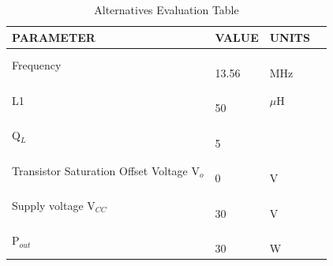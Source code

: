 \documentclass[12pt]{article}
\begin{document}
\begin{table}[h!]
\centering
\caption{Alternatives Evaluation Table}
\begin{tabular}{| l | l | l | l |}
\hline
\parbox{0.24\linewidth}{\centering PARAMETER} & \parbox{0.240\linewidth}{\centering 
VALUE
} & \parbox{0.240\linewidth}{\centering 
UNITS
}\\ \hline
\parbox{0.24\linewidth}{\raggedleft Frequency} &
\parbox{0.240\linewidth}{\hfill \\
13.56
\\} & \parbox{0.240\linewidth}{\hfill \\
MHz
\\}\\ \hline
\parbox{0.24\linewidth}{\raggedleft L1} & 
\parbox{0.240\linewidth}{\hfill \\
50
\\} & \parbox{0.240\linewidth}{\hfill \\
$\mu$H
\\}\\ \hline
\parbox{0.24\linewidth}{\raggedleft Q$_L$} & 
\parbox{0.240\linewidth}{\hfill \\
5
\\} & \parbox{0.240\linewidth}{\hfill \\
\space
\\}\\ \hline
\parbox{0.24\linewidth}{\raggedleft \hfill\\ Transistor Saturation \\ Offset Voltage V$_o$\\[0.5em]} &
\parbox{0.240\linewidth}{\hfill \\
0
\\} & \parbox{0.240\linewidth}{\hfill \\
V
\\}\\ \hline
\parbox{0.24\linewidth}{\raggedleft Supply voltage V$_{CC}$} & 
\parbox{0.240\linewidth}{\hfill \\
30
\\} & \parbox{0.240\linewidth}{\hfill \\
V
\\}\\ \hline
\parbox{0.24\linewidth}{\raggedleft P$_{out}$} & 
\parbox{0.240\linewidth}{\hfill \\
30
\\} & \parbox{0.240\linewidth}{\hfill \\
W
\\}\\ \hline

\end{tabular}
\end{table}
\end{document}
